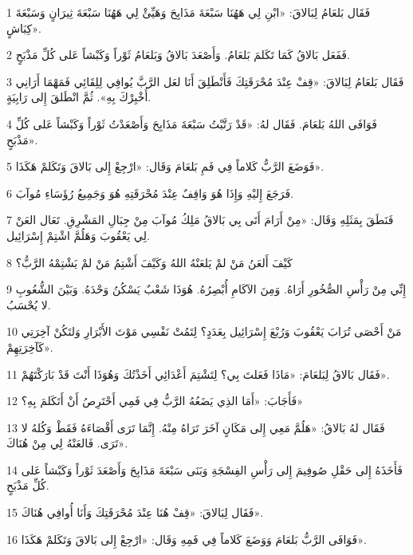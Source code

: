 \par 1 فَقَال بَلعَامُ لِبَالاقَ: «ابْنِ لِي هَهُنَا سَبْعَةَ مَذَابِحَ وَهَيِّئْ لِي هَهُنَا سَبْعَةَ ثِيرَانٍ وَسَبْعَةَ كِبَاشٍ».
\par 2 فَفَعَل بَالاقُ كَمَا تَكَلمَ بَلعَامُ. وَأَصْعَدَ بَالاقُ وَبَلعَامُ ثَوْراً وَكَبْشاً عَلى كُلِّ مَذْبَحٍ.
\par 3 فَقَال بَلعَامُ لِبَالاقَ: «قِفْ عِنْدَ مُحْرَقَتِكَ فَأَنْطَلِقَ أَنَا لعَل الرَّبَّ يُوافِي لِلِقَائِي فَمَهْمَا أَرَانِي أُخْبِرْكَ بِهِ». ثُمَّ انْطَلقَ إِلى رَابِيَةٍ.
\par 4 فَوَافَى اللهُ بَلعَامَ. فَقَال لهُ: «قَدْ رَتَّبْتُ سَبْعَةَ مَذَابِحَ وَأَصْعَدْتُ ثَوْراً وَكَبْشاً عَلى كُلِّ مَذْبَحٍ».
\par 5 فَوَضَعَ الرَّبُّ كَلاماً فِي فَمِ بَلعَامَ وَقَال: «ارْجِعْ إِلى بَالاقَ وَتَكَلمْ هَكَذَا».
\par 6 فَرَجَعَ إِليْهِ وَإِذَا هُوَ وَاقِفٌ عِنْدَ مُحْرَقَتِهِ هُوَ وَجَمِيعُ رُؤَسَاءِ مُوآبَ.
\par 7 فَنَطَقَ بِمَثَلِهِ وَقَال: «مِنْ أَرَامَ أَتَى بِي بَالاقُ مَلِكُ مُوآبَ مِنْ جِبَالِ المَشْرِقِ. تَعَال العَنْ لِي يَعْقُوبَ وَهَلُمَّ اشْتِمْ إِسْرَائِيل.
\par 8 كَيْفَ أَلعَنُ مَنْ لمْ يَلعَنْهُ اللهُ وَكَيْفَ أَشْتِمُ مَنْ لمْ يَشْتِمْهُ الرَّبُّ؟
\par 9 إِنِّي مِنْ رَأْسِ الصُّخُورِ أَرَاهُ. وَمِنَ الآكَامِ أُبْصِرُهُ. هُوَذَا شَعْبٌ يَسْكُنُ وَحْدَهُ. وَبَيْنَ الشُّعُوبِ لا يُحْسَبُ.
\par 10 مَنْ أَحْصَى تُرَابَ يَعْقُوبَ وَرُبْعَ إِسْرَائِيل بِعَدَدٍ؟ لِتَمُتْ نَفْسِي مَوْتَ الأَبْرَارِ وَلتَكُنْ آخِرَتِي كَآخِرَتِهِمْ».
\par 11 فَقَال بَالاقُ لِبَلعَامَ: «مَاذَا فَعَلتَ بِي؟ لِتَشْتِمَ أَعْدَائِي أَخَذْتُكَ وَهُوَذَا أَنْتَ قَدْ بَارَكْتَهُمْ».
\par 12 فَأَجَابَ: «أَمَا الذِي يَضَعُهُ الرَّبُّ فِي فَمِي أَحْتَرِصُ أَنْ أَتَكَلمَ بِهِ؟»
\par 13 فَقَال لهُ بَالاقُ: «هَلُمَّ مَعِي إِلى مَكَانٍ آخَرَ تَرَاهُ مِنْهُ. إِنَّمَا تَرَى أَقْصَاءَهُ فَقَطْ وَكُلهُ لا تَرَى. فَالعَنْهُ لِي مِنْ هُنَاكَ».
\par 14 فَأَخَذَهُ إِلى حَقْلِ صُوفِيمَ إِلى رَأْسِ الفِسْجَةِ وَبَنَى سَبْعَةَ مَذَابِحَ وَأَصْعَدَ ثَوْراً وَكَبْشاً عَلى كُلِّ مَذْبَحٍ.
\par 15 فَقَال لِبَالاقَ: «قِفْ هُنَا عِنْدَ مُحْرَقَتِكَ وَأَنَا أُوافِي هُنَاكَ».
\par 16 فَوَافَى الرَّبُّ بَلعَامَ وَوَضَعَ كَلاماً فِي فَمِهِ وَقَال: «ارْجِعْ إِلى بَالاقَ وَتَكَلمْ هَكَذَا».
